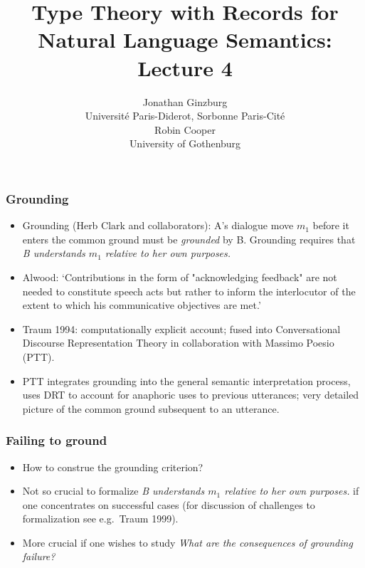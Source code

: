 \documentclass{beamer}
\title{Type Theory with Records for Natural Language Semantics:\\
  Lecture 4     }
\author{Jonathan Ginzburg\\
Universit\'e Paris-Diderot, Sorbonne Paris-Cit\'e\\
Robin Cooper\\ 
University of Gothenburg}
\date{}
\newcommand{\bit}{\begin{itemize}}
\newcommand{\eit}{\end{itemize}}
\newcommand{\ignore}[1]{}
\begin{document}
\maketitle


\ignore{
Lecture 4.
We provide a unified theory of metacommunicative and illocutionary interaction on the basis of the notion of Austinian locutionary propositions. This provides a basis for describing various linguistic phenomena occuring during grounding and clarification interaction.
}





\begin{frame}\frametitle{Grounding}


    
\bit


\item Grounding (Herb Clark and collaborators): A's dialogue move
  $m_{1}$ before it enters the common ground must be {\it grounded} by
  B. Grounding requires that {\it B understands $m_{1}$ relative to
    her own purposes.}
    
    
    \item Alwood:  `Contributions in the form of "acknowledging
feedback" are not needed to
constitute speech acts but rather to inform the interlocutor of the
extent to which his communicative objectives are met.'

\item Traum  1994: computationally explicit account; 
 fused into Conversational Discourse Representation Theory in
 collaboration with Massimo Poesio (PTT).

\item PTT
integrates grounding into the general semantic interpretation process, uses
DRT to account for anaphoric uses to previous utterances;
very detailed picture of the  common ground
subsequent to an utterance. 

\eit\end{frame}

\begin{frame}\frametitle{Failing to ground}

\bit
\item How to construe the grounding criterion?


\item Not so crucial to formalize {\it B understands $m_{1}$ relative to
    her own purposes.} if one concentrates on successful cases (for
  discussion of challenges to formalization see e.g.\ Traum 1999).


\item More crucial if one wishes to study {\it What are the
  consequences of grounding failure?}



\eit\end{frame}
\end{document}
